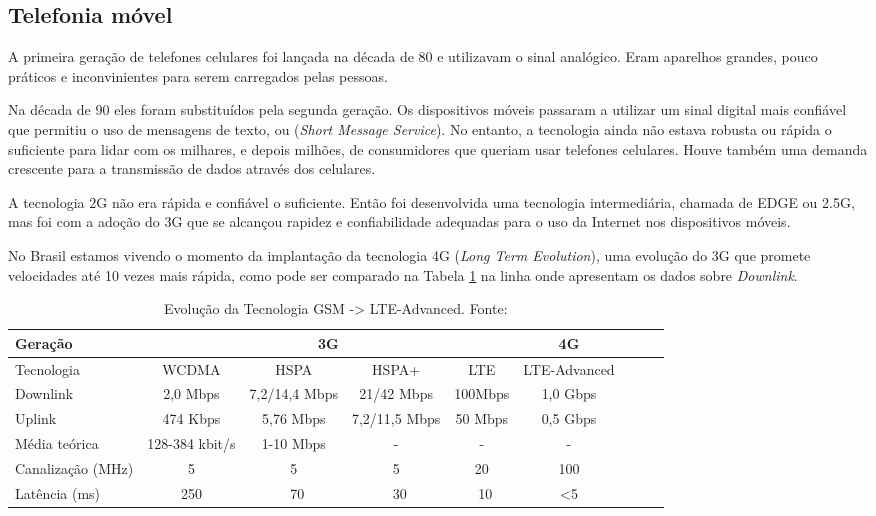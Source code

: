 \subsection{Telefonia móvel}
A primeira geração de telefones celulares foi lançada na década de 80 e utilizavam o sinal analógico. Eram aparelhos grandes, pouco práticos e inconvinientes para serem carregados pelas pessoas.

Na década de 90 eles foram substituídos pela segunda geração. Os dispositivos móveis passaram a utilizar um sinal digital mais confiável que permitiu o uso de mensagens de texto, ou  (\textit{Short Message Service}). No entanto, a tecnologia ainda não estava robusta ou rápida o suficiente para lidar com os milhares, e depois milhões, de consumidores que queriam usar telefones celulares. Houve também uma demanda crescente para a transmissão de dados através dos celulares.

A tecnologia 2G não era rápida e confiável o suficiente. Então foi desenvolvida uma tecnologia intermediária, chamada de EDGE ou 2.5G, mas foi com a adoção do 3G que se alcançou rapidez e confiabilidade adequadas para o uso da Internet nos dispositivos móveis.

No Brasil estamos vivendo o momento da implantação da tecnologia 4G  (\textit{Long Term Evolution}), uma evolução do 3G que promete velocidades até 10 vezes mais rápida, como pode ser comparado na Tabela \ref{tab:LTE} na linha onde apresentam os dados sobre \textit{Downlink}.

\begin{table}[!htb]
	\footnotesize
  	\centering
	\caption[Evolução da Tecnologia GSM -> LTE-Advanced]{Evolução da Tecnologia GSM -> LTE-Advanced. Fonte: \cite{4gamericas}}
	\begin{tabular}{|l|*{8}{c|}}
		\hline \SPACE
		Geração & \multicolumn{4}{|c|}{3G}  & 4G\\ \hline \SPACE
		Tecnologia & WCDMA & HSPA & HSPA+ & LTE & LTE-Advanced\\ \hline \SPACE
		Downlink & 2,0 Mbps & 7,2/14,4 Mbps & 21/42 Mbps & 100Mbps & 1,0 Gbps\\ \hline \SPACE
		Uplink & 474 Kbps & 5,76 Mbps & 7,2/11,5 Mbps & 50 Mbps & 0,5 Gbps\\ \hline \SPACE
		Média teórica & 128-384 kbit/s & 1-10 Mbps & - & - & -\\ \hline \SPACE
		Canalização (MHz) & 5 & 5 & 5 & 20 & 100\\ \hline \SPACE
		Latência (ms) & 250 & ~70 & ~30 & ~10 & <5\\ \hline
	\end{tabular}
	\label{tab:LTE}
\end{table}%

